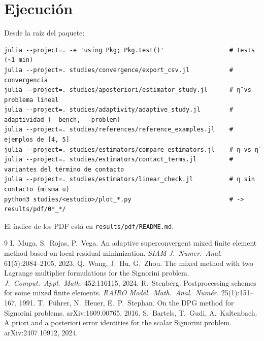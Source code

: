 \documentclass[11pt,a4paper]{article}
\newcommand{\code}[1]{\texttt{#1}}
\begin{document}
\section{Ejecución}

Desde la raíz del paquete:
\begin{Verbatim}
julia --project=. -e 'using Pkg; Pkg.test()'                  # tests (~1 min)
julia --project=. studies/convergence/export_csv.jl           # convergencia
julia --project=. studies/aposteriori/estimator_study.jl      # η̃ vs problema lineal
julia --project=. studies/adaptivity/adaptive_study.jl        # adaptividad (--bench, --problem)
julia --project=. studies/references/reference_examples.jl    # ejemplos de [4, 5]
julia --project=. studies/estimators/compare_estimators.jl    # η vs η̃
julia --project=. studies/estimators/contact_terms.jl         # variantes del término de contacto
julia --project=. studies/estimators/linear_check.jl          # η sin contacto (misma u)
python3 studies/<estudio>/plot_*.py                           # -> results/pdf/0*_*/
\end{Verbatim}
El índice de los PDF está en \code{results/pdf/README.md}.

\begin{thebibliography}{9}
 I.~Muga, S.~Rojas, P.~Vega. An adaptive superconvergent mixed finite element
  method based on local residual minimization. \emph{SIAM J.\ Numer.\ Anal.} 61(5):2084--2105, 2023.
 Q.~Wang, J.~Hu, G.~Zhou. The mixed method with two Lagrange multiplier
  formulations for the Signorini problem. \emph{J.\ Comput.\ Appl.\ Math.} 452:116115, 2024.
 R.~Stenberg. Postprocessing schemes for some mixed finite elements.
  \emph{RAIRO Modél.\ Math.\ Anal.\ Numér.} 25(1):151--167, 1991.
 T.~Führer, N.~Heuer, E.~P.~Stephan. On the DPG method for Signorini problems.
  arXiv:1609.00765, 2016.
 S.~Bartels, T.~Gudi, A.~Kaltenbach. A priori and a posteriori error identities for
  the scalar Signorini problem. arXiv:2407.10912, 2024.
\end{thebibliography}
\end{document}
